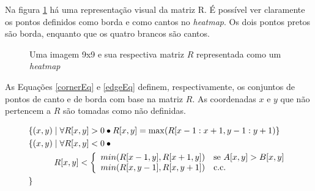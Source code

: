 \documentclass[12pt]{article}
\begin{document}
Na  figura \ref{figR}  há uma  representação  visual da  matriz R.   É
possível ver claramente  os pontos definidos como borda  e como cantos
no \textit{heatmap}. Os dois pontos  pretos são borda, enquanto que os
quatro brancos são cantos.

\begin{figure}[h]
  \centering
  \quad
  \caption{Uma imagem 9x9 e sua respectiva matriz $R$ representada
    como um \textit{heatmap}\label{figR}}
\end{figure}


As Equações \ref{cornerEq} e \ref{edgeEq} definem, respectivamente, os
conjuntos de  pontos de canto  e de borda  com base na matriz  $R$. As
coordenadas $x$  e $y$ que  não pertencem a  $R$ são tomadas  como não
definidas.

\begin{align}
  &\{(x, y) \mid \forall R[x,y] > 0 \bullet R[x,y] = \max(R[x-1:x+1,y-1:y+1)\} \label{cornerEq} \\
  &\{
    (x, y) \mid \forall R[x,y] < 0 \bullet \mbox{} \nonumber \\
  & \quad\quad\quad R[x,y] < \left\{
      \begin{array}{l l}
        min(R[x-1,y], R[x+1,y]) & \mbox{se} \,\, A[x,y] > B[x,y]\\
        min(R[x,y-1], R[x,y+1]) & \mbox{c.c.}\\
      \end{array}
    \right. \\ \label{edgeEq}
  &\} \nonumber
\end{align}
\end{document}

